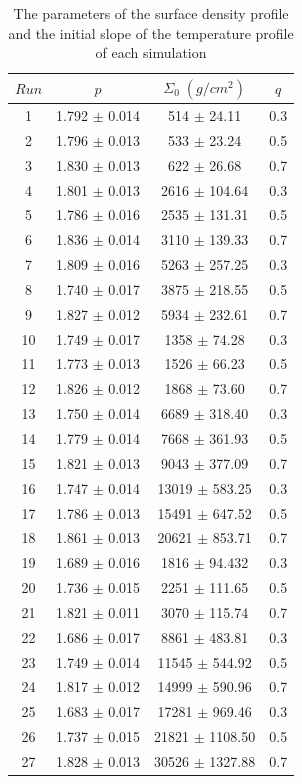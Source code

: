 \documentclass[aps,prb,twocolumn,superscriptaddress,floatfix,longbibliography]{revtex4-2}
\newcounter{para}
\begin{document}
\begin{table}[!htbp]
  \centering
  \setlength{\tabcolsep}{12pt} %
  \begin{tabular}{cccc}
  \hline
  $Run$ & $p$ &  $\Sigma_0 \; (g/cm^2)$ & $q$ \\
  \hline \hline
  1 & 1.792 $\pm$ 0.014 & 514 $\pm$ 24.11 & 0.3\\
  2 & 1.796 $\pm$ 0.013 & 533 $\pm$ 23.24 & 0.5 \\
  3 & 1.830 $\pm$ 0.013 & 622 $\pm$ 26.68 & 0.7 \\
  \hline
  4 & 1.801 $\pm$ 0.013 & 2616 $\pm$ 104.64 & 0.3 \\
  5 & 1.786 $\pm$ 0.016 & 2535 $\pm$ 131.31 & 0.5 \\
  6 & 1.836 $\pm$ 0.014 & 3110 $\pm$ 139.33 & 0.7 \\
  \hline
  7 & 1.809 $\pm$ 0.016 & 5263 $\pm$ 257.25 & 0.3 \\
  8 & 1.740 $\pm$ 0.017 & 3875 $\pm$ 218.55 & 0.5 \\
  9 & 1.827 $\pm$ 0.012 & 5934 $\pm$ 232.61 & 0.7 \\
  \hline
  10 & 1.749 $\pm$ 0.017 & 1358 $\pm$ 74.28 & 0.3 \\
  11 & 1.773 $\pm$ 0.013 & 1526 $\pm$ 66.23 & 0.5 \\
  12 & 1.826 $\pm$ 0.012 & 1868 $\pm$ 73.60 & 0.7 \\
  \hline
  13 & 1.750 $\pm$ 0.014 & 6689 $\pm$ 318.40 & 0.3 \\
  14 & 1.779 $\pm$ 0.014 & 7668 $\pm$ 361.93 & 0.5 \\
  15 & 1.821 $\pm$ 0.013 & 9043 $\pm$ 377.09 & 0.7 \\
  \hline
  16 & 1.747 $\pm$ 0.014 & 13019 $\pm$ 583.25 & 0.3 \\
  17 & 1.786 $\pm$ 0.013 & 15491 $\pm$ 647.52 & 0.5 \\
  18 & 1.861 $\pm$ 0.013 & 20621 $\pm$ 853.71 & 0.7 \\
  \hline
  19 & 1.689 $\pm$ 0.016 & 1816 $\pm$ 94.432 & 0.3 \\
  20 & 1.736 $\pm$ 0.015 & 2251 $\pm$ 111.65 & 0.5 \\
  21 & 1.821 $\pm$ 0.011 & 3070 $\pm$ 115.74 & 0.7 \\
  \hline
  22 & 1.686 $\pm$ 0.017 & 8861 $\pm$ 483.81 & 0.3 \\
  23 & 1.749 $\pm$ 0.014 & 11545 $\pm$ 544.92 & 0.5 \\
  24 & 1.817 $\pm$ 0.012 & 14999 $\pm$ 590.96 & 0.7 \\
  \hline
  25 & 1.683 $\pm$ 0.017 & 17281 $\pm$ 969.46 & 0.3 \\
  26 & 1.737 $\pm$ 0.015 & 21821 $\pm$ 1108.50 & 0.5 \\
  27 & 1.828 $\pm$ 0.013 & 30526 $\pm$ 1327.88 & 0.7 \\
  \hline
 \end{tabular}
\caption{The parameters of the surface density profile and the initial slope of the temperature profile of each simulation}\label{tab:final slopes}
\end{table}
\end{document}
